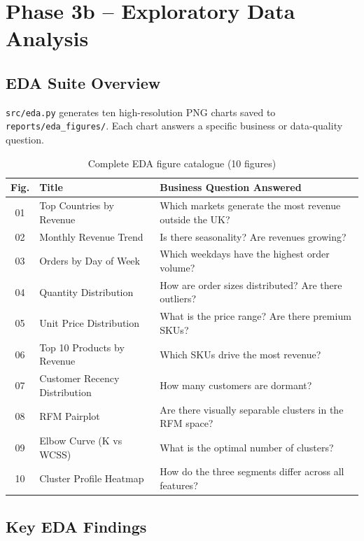 \documentclass[12pt,a4paper]{report}
\begin{document}
\chapter{Phase 3b -- Exploratory Data Analysis}

\section{EDA Suite Overview}

\texttt{src/eda.py} generates ten high-resolution PNG charts saved to \texttt{reports/eda\_figures/}. Each chart answers a specific business or data-quality question.

\begin{table}[H]
\centering
\caption{Complete EDA figure catalogue (10 figures)}
\begin{tabularx}{\textwidth}{clX}
\toprule
\textbf{Fig.} & \textbf{Title} & \textbf{Business Question Answered} \\
\midrule
01 & Top Countries by Revenue & Which markets generate the most revenue outside the UK? \\
02 & Monthly Revenue Trend & Is there seasonality? Are revenues growing? \\
03 & Orders by Day of Week & Which weekdays have the highest order volume? \\
04 & Quantity Distribution & How are order sizes distributed? Are there outliers? \\
05 & Unit Price Distribution & What is the price range? Are there premium SKUs? \\
06 & Top 10 Products by Revenue & Which SKUs drive the most revenue? \\
07 & Customer Recency Distribution & How many customers are dormant? \\
08 & RFM Pairplot & Are there visually separable clusters in the RFM space? \\
09 & Elbow Curve (K vs WCSS) & What is the optimal number of clusters? \\
10 & Cluster Profile Heatmap & How do the three segments differ across all features? \\
\bottomrule
\end{tabularx}
\end{table}

\section{Key EDA Findings}
\end{document}
